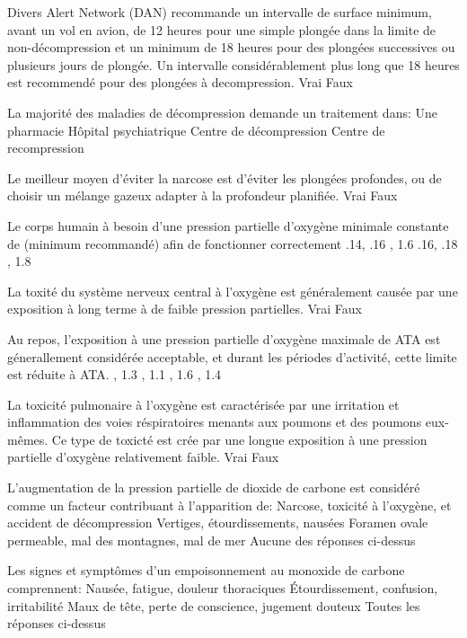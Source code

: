 \documentclass[english,12pt,a4paper]{article}
\begin{document}
\begin{outline}
		\1 Divers Alert Network (DAN) recommande un intervalle de surface minimum, avant un vol en avion, de 12 heures pour une simple plongée dans la limite de non-décompression et un minimum de 18 heures pour des plongées successives ou plusieurs jours de plongée. Un intervalle considérablement plus long que 18 heures est recommendé pour des plongées à decompression.
			\2 Vrai
			\2 Faux

		\1 La majorité des maladies de décompression demande un traitement dans:
			\2 Une pharmacie
			\2 Hôpital psychiatrique
			\2 Centre de décompression
			\2 Centre de recompression

		\1 Le meilleur moyen d'éviter la narcose est d'éviter les plongées profondes, ou de choisir un mélange gazeux adapter à la profondeur planifiée.
			\2 Vrai
			\2 Faux

		\1 Le corps humain à besoin d'une pression partielle d'oxygène minimale constante de \underline{\hspace{1.5cm}} (minimum \underline{\hspace{1.5cm}} recommandé) afin de fonctionner correctement
			\2 .14, .16 
			\2 1.4, 1.6 
			\2 .16, .18 
			\2 1.6, 1.8

		\1 La toxité du système nerveux central à l'oxygène est généralement causée par une exposition à long terme à de faible pression partielles.
			\2 Vrai
			\2 Faux

		\1 Au repos, l'exposition à une pression partielle d'oxygène maximale de \underline{\hspace{1.5cm}} ATA est génerallement considérée acceptable, et durant les périodes d'activité, cette limite est réduite à \underline{\hspace{1.5cm}} ATA.
			\2 1.1, 1.3
			\2 1.3, 1.1
			, 1.6
			, 1.4

		\1 La toxicité pulmonaire à l'oxygène est caractérisée par une irritation et inflammation des voies réspiratoires menants aux poumons et des poumons eux-mêmes. Ce type de toxicté est crée par une longue exposition à une pression partielle d'oxygène relativement faible.
			\2 Vrai
			\2 Faux

		\1 L'augmentation de la pression partielle de dioxide de carbone est considéré comme un facteur contribuant à l'apparition de:
			\2 Narcose, toxicité à l'oxygène, et accident de décompression
			\2 Vertiges, étourdissements, nausées
			\2 Foramen ovale permeable, mal des montagnes, mal de mer
			\2 Aucune des réponses ci-dessus

		\1 Les signes et symptômes d'un empoisonnement au monoxide de carbone comprennent:
			\2 Nausée, fatigue, douleur thoraciques
			\2 Étourdissement, confusion, irritabilité
			\2 Maux de tête, perte de conscience, jugement douteux
			\2 Toutes les réponses ci-dessus
	\end{outline}
	\pagebreak
\end{document}
